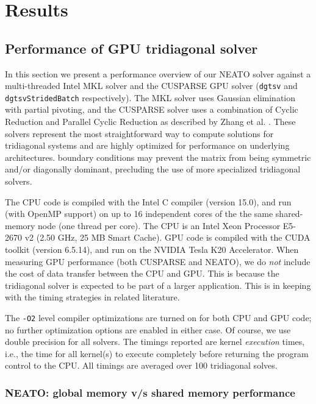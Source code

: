 \chapter{Results}

\section{Performance of GPU tridiagonal solver}

In this section we present a performance overview
of our NEATO solver
against a multi-threaded Intel MKL solver and
the CUSPARSE GPU solver
(\texttt{dgtsv} and \texttt{dgtsvStridedBatch} respectively).
The MKL solver uses Gaussian elimination with partial pivoting,
and the CUSPARSE solver uses a combination of
Cyclic Reduction and Parallel Cyclic Reduction
as described by Zhang et al. \cite{Zhang2010FTS}.
These solvers represent the most straightforward way
to compute solutions for tridiagonal systems
and are highly optimized for performance on
underlying architectures.
boundary conditions may prevent
the matrix from being symmetric and/or diagonally dominant,
precluding the use of more specialized tridiagonal solvers.

The CPU code is compiled with the Intel C compiler (version 15.0),
and run (with OpenMP support) on up to
16 independent cores of the the same shared-memory node
(one thread per core).
The CPU is an
Intel Xeon Processor E5-2670 v2 (2.50 GHz, 25 MB Smart Cache).
GPU code is compiled with the CUDA toolkit (version 6.5.14),
and run on the
NVIDIA Tesla K20 Accelerator.
When measuring GPU performance (both CUSPARSE and NEATO),
we do \emph{not} include the cost
of data transfer between the CPU and GPU.
This is because the tridiagonal solver is expected to be
part of a larger application.
This is in keeping with the timing strategies
in related literature.

The \texttt{-O2} level compiler optimizations are turned on for both
CPU and GPU code;
no further optimization options are enabled in either case.
Of course, we use double precision for all solvers.
The timings reported are
kernel \emph{execution} times, i.e.,
the time for all kernel(s) to execute completely
before returning the program control to the CPU.
All timings are averaged over 100 tridiagonal solves.

\subsection{NEATO: global memory v/s shared memory performance}

